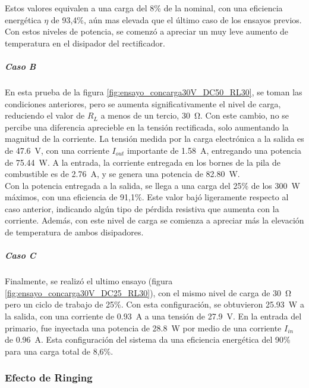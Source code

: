 Estos valores equivalen a una carga del 8\% de la nominal, con una eficiencia energética $\eta$ de 93,4\%, aún mas elevada que el último caso de los ensayos previos. Con estos niveles de potencia, se comenzó a apreciar un muy leve aumento de temperatura en el disipador del rectificador.\\

\subparagraph{Caso B}

En esta prueba de la figura \ref{fig:ensayo_concarga30V_DC50_RL30}, se toman las condiciones anteriores, pero se aumenta significativamente el nivel de carga, reduciendo el valor de $R_L$ a menos de un tercio, \SI[]{30}{\ohm}. Con este cambio, no se percibe una diferencia aprecieble en la tensión rectificada, solo aumentando la magnitud de la corriente. La tensión medida por la carga electrónica a la salida es de \SI[]{47.6}{\volt}, con una corriente $I_{out}$ importante de \SI[]{1.58}{\ampere}, entregando una potencia de \SI[]{75.44}{\watt}. A la entrada, la corriente entregada en los bornes de la pila de combustible es de \SI[]{2.76}{\ampere}, y se genera una potencia de \SI[]{82.80}{\watt}.\\

Con la potencia entregada a la salida, se llega a una carga del 25\% de los \SI[]{300}{\watt} máximos, con una eficiencia de 91,1\%. Este valor bajó ligeramente respecto al caso anterior, indicando algún tipo de pérdida resistiva que aumenta con la corriente. Además, con este nivel de carga se comienza a apreciar más la elevación de temperatura de ambos disipadores.\\

\subparagraph{Caso C}

Finalmente, se realizó el ultimo ensayo (figura \ref{fig:ensayo_concarga30V_DC25_RL30}), con el mismo nivel de carga de \SI[]{30}{\ohm} pero un ciclo de trabajo de 25\%. Con esta configuración, se obtuvieron \SI[]{25.93}{\watt} a la salida, con una corriente de \SI[]{0.93}{\ampere} a una tensión de \SI[]{27.9}{\volt}. En la entrada del primario, fue inyectada una potencia de \SI[]{28.8}{\watt} por medio de una corriente $I_{in}$ de \SI[]{0.96}{\ampere}. Esta configuración del sistema da una eficiencia energética del 90\% para una carga total de 8,6\%.\\

\subsubsection{Efecto de Ringing}

